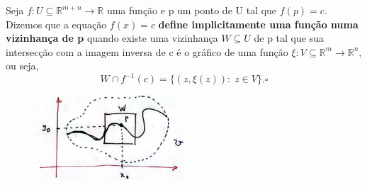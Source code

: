 \documentclass[../analysisII_notes.tex]{subfiles}
\begin{document}
\begin{def*}
	Seja \(f:U\subseteq \mathbb{R}^{m+n}\rightarrow \mathbb{R}\) uma função e p um ponto de U tal que \(f(p) = c.\) Dizemos que a equação \(f(x) = c\) \textbf{define implicitamente uma função numa vizinhança de p} quando existe uma vizinhança \(W\subseteq U\) de p tal que sua intersecção com a imagem inversa de c é o gráfico de uma função \(\xi :V\subseteq \mathbb{R}^{m}\rightarrow \mathbb{R}^{n}\), ou seja,
	\[
		W\cap f^{-1}(c) = \{(z, \xi (z)):\; z\in V\}. \square
	\]
\end{def*}
\begin{figure}[H]
	\begin{center}
		\includegraphics[height=0.5\textheight, width=0.5\textwidth, keepaspectratio]{./Images/implicit_function_26.png}
	\end{center}
\end{figure}
\end{document}
